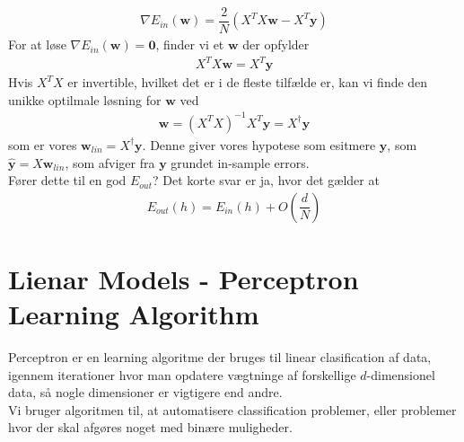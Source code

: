\documentclass[paper=a4, fontsize=11pt]{scrartcl} %
\numberwithin{equation}{section} %
\numberwithin{figure}{section} %
\numberwithin{table}{section} %
\begin{document}
	\begin{align*}
	\nabla E_{in}(\mathbf{w})=\dfrac{2}{N}(X^TX\mathbf{w}-X^T\mathbf{y})
	\end{align*}
	For at løse $\nabla E_{in}(\mathbf{w})=\mathbf{0}$, finder vi et $\mathbf{w}$ der opfylder
	\begin{align*}
	X^TX\mathbf{w}=X^T\mathbf{y}
	\end{align*}
	Hvis $X^TX$ er invertible, hvilket det er i de fleste tilfælde er, kan vi finde den unikke optilmale løsning for $\mathbf{w}$ ved
	\begin{align*}
	\mathbf{w}=(X^TX)^{-1}X^T\mathbf{y}=X^\dagger\mathbf{y}
	\end{align*} 
	som er vores $\mathbf{w}_{lin}=X^\dagger\mathbf{y}$. Denne giver vores hypotese som esitmere $\mathbf{y}$, som $\hat{\mathbf{y}}=X\mathbf{w}_{lin}$, som afviger fra $\mathbf{y}$ grundet in-sample errors. \\
	
	Fører dette til en god $E_{out}$? Det korte svar er ja, hvor det gælder at
	\begin{align*}
	E_{out}(h)=E_{in}(h)+O\left(\dfrac{d}{N}\right)
	\end{align*}
	
	\newpage
	
	\section*{Lienar Models - Perceptron Learning Algorithm}
	
	Perceptron er en learning algoritme der bruges til linear clasification af data, igennem iterationer hvor man opdatere vægtninge af forskellige $d$-dimensionel data, så nogle dimensioner er vigtigere end andre. \\
	
	Vi bruger algoritmen til, at automatisere classification problemer, eller problemer hvor der skal afgøres noget med binære muligheder. \\
	
\end{document}
